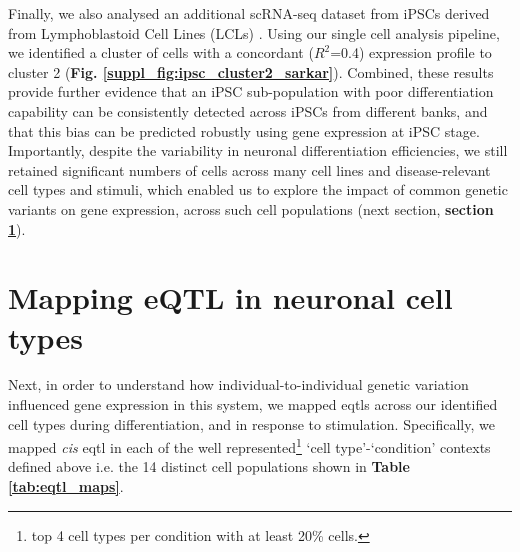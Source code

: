 Finally, we also analysed an additional scRNA-seq dataset from iPSCs derived from Lymphoblastoid Cell Lines (LCLs) \cite{sarkar2019discovery}. 
Using our single cell analysis pipeline, we identified a cluster of cells with a concordant ($R^2$=0.4) expression profile to cluster 2 (\textbf{Fig. \ref{suppl_fig:ipsc_cluster2_sarkar}}). 
Combined, these results provide further evidence that an iPSC sub-population with poor differentiation capability can be consistently detected across iPSCs from different banks, and that this bias can be predicted robustly using gene expression at iPSC stage. \\

Importantly, despite the variability in neuronal differentiation efficiencies, 
we still retained significant numbers of cells across many cell lines and disease-relevant cell types and stimuli, which 
enabled us to 
explore the impact of common genetic variants on gene expression, across such cell populations (next section, \textbf{section \ref{sec:neuroseq_eqt}}).


\newpage

\section{Mapping eQTL in neuronal cell types}
\label{sec:neuroseq_eqt}

Next, in order to understand how individual-to-individual genetic variation influenced gene expression in this system, we mapped \glspl{eqtl} across our identified cell types during differentiation, and in response to stimulation.
Specifically, we mapped \textit{cis} \gls{eqtl} in each of the well represented\footnote{top 4 cell types per condition with at least 20\% cells.} `cell type'-`condition' contexts defined above
i.e.
the 14 distinct cell populations shown in \textbf{Table \ref{tab:eqtl_maps}}. 

